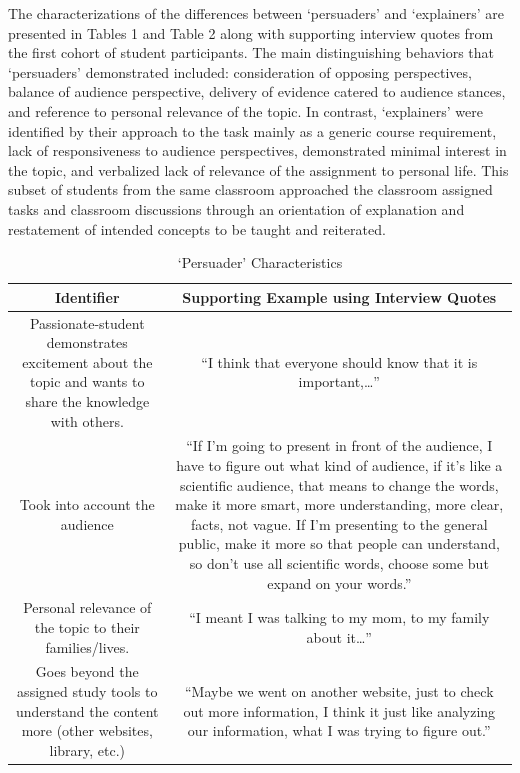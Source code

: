 \documentclass[11.5pt]{sig-alternate} %
\begin{document}
\begin{large}
The characterizations of the differences between ‘persuaders’ and ‘explainers’ are presented in Tables 1 and Table 2 along with supporting interview quotes from the first cohort of student participants. The main distinguishing behaviors that ‘persuaders’ demonstrated included: consideration of opposing perspectives, balance of audience perspective, delivery of evidence catered to audience stances, and reference to personal relevance of the topic. In contrast, ‘explainers’ were identified by their approach to the task mainly as a generic course requirement, lack of responsiveness to audience perspectives, demonstrated minimal interest in the topic, and verbalized lack of relevance of the assignment to personal life. This subset of students from the same classroom approached the classroom assigned tasks and classroom discussions through an orientation of explanation and restatement of intended concepts to be taught and reiterated.

\begin{table}[ht]
\caption{`Persuader' Characteristics}
\begin{tabular}{|c|c|}
\hline
Identifier & Supporting Example using Interview Quotes \\ \hline
Passionate-student demonstrates excitement about the topic and wants to share the knowledge with others. & “I think that everyone should know that it is important,…” \\ \hline
Took into account the audience & “If I’m going to present in front of the audience, I have to figure out what kind of audience, if it’s like a scientific audience, that means to change the words, make it more smart, more understanding, more clear, facts, not vague. If I’m presenting to the general public, make it more so that people can understand, so don’t use all scientific words, choose some but expand on your words.” \\ \hline
Personal relevance of the topic to their families/lives. & “I meant I was talking to my mom, to my family about it…” \\ \hline
Goes beyond the assigned study tools to understand the content more (other websites, library, etc.) & “Maybe we went on another website, just to check out more information, I think it just like analyzing our information, what I was trying to figure out.” \\ \hline
\end{tabular}
\end{table}


\end{large}
\end{document}
